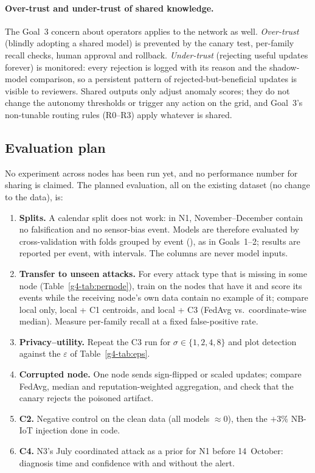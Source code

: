 \paragraph{Over-trust and under-trust of shared knowledge.} The Goal~3 concern about operators applies to the network as well. \emph{Over-trust} (blindly adopting a shared model) is prevented by the canary test, per-family recall checks, human approval and rollback. \emph{Under-trust} (rejecting useful updates forever) is monitored: every rejection is logged with its reason and the shadow-model comparison, so a persistent pattern of rejected-but-beneficial updates is visible to reviewers. Shared outputs only adjust anomaly scores; they do not change the autonomy thresholds or trigger any action on the grid, and Goal~3's non-tunable routing rules (R0--R3) apply whatever is shared.



\subsection{Evaluation plan}
\label{g4-sec:eval}

No experiment across nodes has been run yet, and no performance number for sharing is claimed. The planned evaluation, all on the existing dataset (no change to the data), is:
\begin{enumerate}
  \item \textbf{Splits.} A calendar split does not work: in N1, November--December contain no falsification and no sensor-bias event. Models are therefore evaluated by cross-validation with folds grouped by event (), as in Goals~1--2; results are reported per event, with intervals. The  columns are never model inputs.
  \item \textbf{Transfer to unseen attacks.} For every attack type that is missing in some node (Table~\ref{g4-tab:pernode}), train on the nodes that have it and score its events while the receiving node's own data contain no example of it; compare local only, local + C1 centroids, and local + C3 (FedAvg vs.\ coordinate-wise median). Measure per-family recall at a fixed false-positive rate.
  \item \textbf{Privacy--utility.} Repeat the C3 run for $\sigma\in\{1,2,4,8\}$ and plot detection against the $\varepsilon$ of Table~\ref{g4-tab:eps}.
  \item \textbf{Corrupted node.} One node sends sign-flipped or scaled updates; compare FedAvg, median and reputation-weighted aggregation, and check that the canary rejects the poisoned artifact.
  \item \textbf{C2.} Negative control on the clean data (all models $\approx0$), then the $+3\%$ NB-IoT injection done in code.
  \item \textbf{C4.} N3's July coordinated attack as a prior for N1 before 14~October: diagnosis time and confidence with and without the alert.
\end{enumerate}


